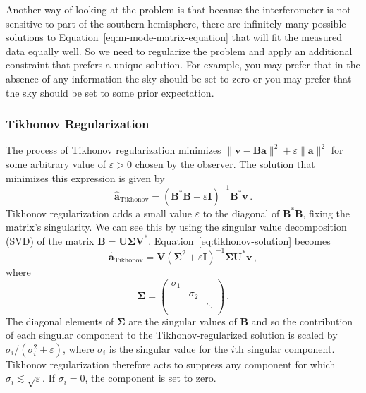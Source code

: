\documentclass[twocolumn]{aastex61}
\renewcommand{\b}{\pmb}
\newcommand{\atikh}{\b{\hat a}_\text{Tikhonov}}
\begin{document}
Another way of looking at the problem is that because the interferometer is not sensitive to part of
the southern hemisphere, there are infinitely many possible solutions to
Equation~\ref{eq:m-mode-matrix-equation} that will fit the measured data equally well. So we need to
regularize the problem and apply an additional constraint that prefers a unique solution. For
example, you may prefer that in the absence of any information the sky should be set to zero or you
may prefer that the sky should be set to some prior expectation.

\subsubsection{Tikhonov Regularization}

The process of Tikhonov regularization minimizes $\|\b v - \b B\b a\|^2 + \varepsilon\|\b a\|^2$ for
some arbitrary value of $\varepsilon > 0$ chosen by the observer. The solution that minimizes this
expression is given by
\begin{equation}\label{eq:tikhonov-solution}
    \atikh = (\b B^*\b B + \varepsilon\b I)^{-1}\b B^*\b v\,.
\end{equation}
Tikhonov regularization adds a small value $\varepsilon$ to the diagonal of $\b B^*\b B$, fixing the
matrix's singularity. We can see this by using the singular value decomposition (SVD) of the matrix
$\b B = \b U \b \Sigma \b V^*$. Equation~\ref{eq:tikhonov-solution} becomes
\begin{equation}
    \atikh = \b V (\b\Sigma^2 + \varepsilon \b I)^{-1}\b\Sigma \b U^*\b v\,,
\end{equation}
where
\[
    \b\Sigma = \left(
        \begin{array}{ccc}
            \sigma_1 & & \\
                     & \sigma_2 & \\
                     & & \ddots \\
        \end{array}
    \right)\,.
\]
The diagonal elements of $\b\Sigma$ are the singular values of $\b B$ and so the contribution of
each singular component to the Tikhonov-regularized solution is scaled by $\sigma_i / (\sigma_i^2 +
\varepsilon)$, where $\sigma_i$ is the singular value for the $i$th singular component. Tikhonov
regularization therefore acts to suppress any component for which
$\sigma_i\lesssim\sqrt{\varepsilon}$.  If $\sigma_i = 0$, the component is set to zero.
\end{document}
